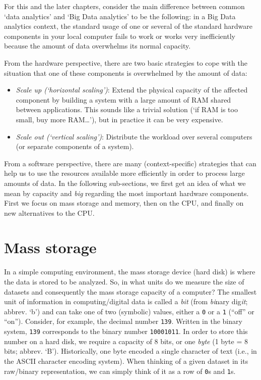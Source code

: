 \documentclass[
  12pt,
]{style/krantz}
\providecommand{\tightlist}{%
  \setlength{\itemsep}{0pt}\setlength{\parskip}{0pt}}
\begin{document}
For this and the later chapters, consider the main difference between common `data analytics' and `Big Data analytics' to be the following: in a Big Data analytics context, the standard usage of one or several of the standard hardware components in your local computer fails to work or works very inefficiently because the amount of data overwhelms its normal capacity.

From the hardware perspective, there are two basic strategies to cope with the situation that one of these components is overwhelmed by the amount of data:

\begin{itemize}
\tightlist
\item
  \emph{Scale up (`horizontal scaling')}: Extend the physical capacity of the affected component by building a system with a large amount of RAM shared between applications. This sounds like a trivial solution (`if RAM is too small, buy more RAM\ldots{}'), but in practice it can be very expensive.
\item
  \emph{Scale out (`vertical scaling')}: Distribute the workload over several computers (or separate components of a system).
\end{itemize}

From a software perspective, there are many (context-specific) strategies that can help us to use the resources available more efficiently in order to process large amounts of data. In the following sub-sections, we first get an idea of what we mean by capacity and \emph{big} regarding the most important hardware components. First we focus on mass storage and memory, then on the CPU, and finally on new alternatives to the CPU.

\hypertarget{mass-storage}{%
\section{Mass storage}\label{mass-storage}}

In a simple computing environment, the mass storage device (hard disk) is where the data is stored to be analyzed. So, in what units do we measure the size of datasets and consequently the mass storage capacity of a computer? The smallest unit of information in computing/digital data is called a \emph{bit} (from \emph{bi}nary dig\emph{it}; abbrev. `b') and can take one of two (symbolic) values, either a \texttt{0} or a \texttt{1} (``off'' or ``on''). Consider, for example, the decimal number \texttt{139}. Written in the binary system, \texttt{139} corresponds to the binary number \texttt{10001011}. In order to store this number on a hard disk, we require a capacity of 8 bits, or one \emph{byte} (1 byte = 8 bits; abbrev. `B'). Historically, one byte encoded a single character of text (i.e., in the ASCII character encoding system). When thinking of a given dataset in its raw/binary representation, we can simply think of it as a row of \texttt{0}s and \texttt{1}s.
\end{document}
